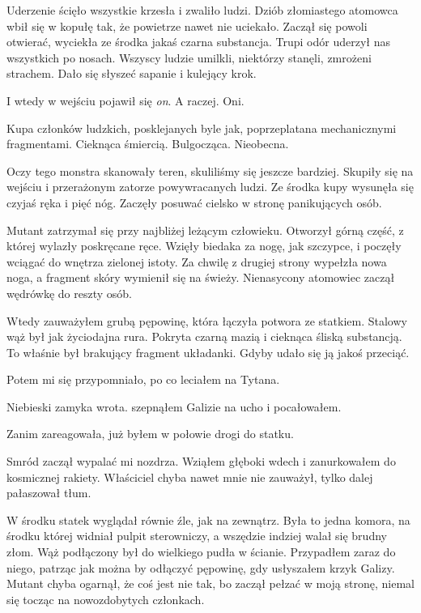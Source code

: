 Uderzenie ścięło wszystkie krzesła i zwaliło ludzi.
Dziób złomiastego atomowca wbił się w kopułę tak, że powietrze nawet nie uciekało.
Zaczął się powoli otwierać, wyciekła ze środka jakaś czarna substancja.
Trupi odór uderzył nas wszystkich po nosach.
Wszyscy ludzie umilkli, niektórzy stanęli, zmrożeni strachem.
Dało się słyszeć sapanie i kulejący krok.

I wtedy w wejściu pojawił się \emph{on}.
A raczej. Oni.

Kupa członków ludzkich, posklejanych byle jak, poprzeplatana mechanicznymi fragmentami.
Cieknąca śmiercią.
Bulgocząca.
Nieobecna.

Oczy tego monstra skanowały teren, skuliliśmy się jeszcze bardziej.
Skupiły się na wejściu i przerażonym zatorze powywracanych ludzi.
Ze środka kupy wysunęła się czyjaś ręka i pięć nóg.
Zaczęły posuwać cielsko w stronę panikujących osób.

Mutant zatrzymał się przy najbliżej leżącym człowieku.
Otworzył górną część, z której wylazły poskręcane ręce.
Wzięły biedaka za nogę, jak szczypce, i poczęły wciągać do wnętrza zielonej istoty.
Za chwilę z drugiej strony wypełzła nowa noga, a fragment skóry wymienił się na świeży.
Nienasycony atomowiec zaczął wędrówkę do reszty osób.

Wtedy zauważyłem grubą pępowinę, która łączyła potwora ze statkiem.
Stalowy wąż był jak życiodajna rura.
Pokryta czarną mazią i cieknąca śliską substancją.
To właśnie był brakujący fragment układanki.
Gdyby udało się ją jakoś przeciąć.

Potem mi się przypomniało, po co leciałem na Tytana.
\begin{dialogue}
	\dm{} Niebieski zamyka wrota. \dm{} szepnąłem Galizie na ucho i pocałowałem.
\end{dialogue}

Zanim zareagowała, już byłem w połowie drogi do statku.

Smród zaczął wypalać mi nozdrza.
Wziąłem głęboki wdech i zanurkowałem do kosmicznej rakiety.
Właściciel chyba nawet mnie nie zauważył, tylko dalej pałaszował tłum.

W środku statek wyglądał równie źle, jak na zewnątrz.
Była to jedna komora, na środku której widniał pulpit sterowniczy, a wszędzie indziej walał się brudny złom.
Wąż podłączony był do wielkiego pudła w ścianie.
Przypadłem zaraz do niego, patrząc jak można by odłączyć pępowinę, gdy usłyszałem krzyk Galizy.
Mutant chyba ogarnął, że coś jest nie tak, bo zaczął pełzać w moją stronę, niemal się tocząc na nowozdobytych członkach.


